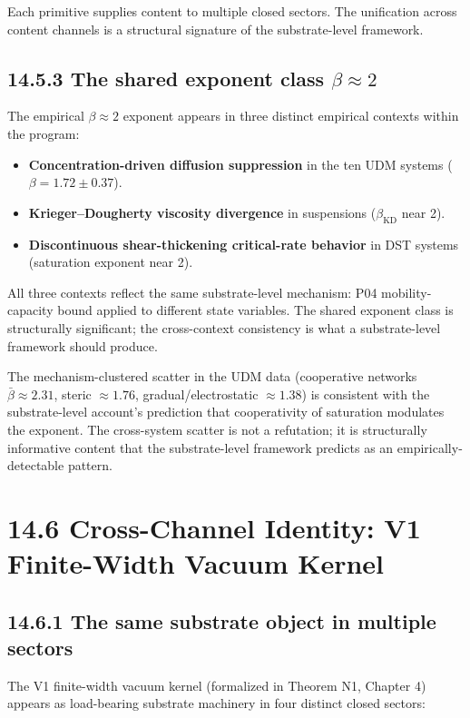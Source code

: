 \documentclass[11pt]{book}
\begin{document}
Each primitive supplies content to multiple closed sectors. The unification across content channels is a structural signature of the substrate-level framework.

\subsection{14.5.3 The shared exponent class $\beta \approx 2$}

The empirical $\beta \approx 2$ exponent appears in three distinct empirical contexts within the program:

\begin{itemize}
\item \textbf{Concentration-driven diffusion suppression} in the ten UDM systems ($\beta = 1.72 \pm 0.37$).
\item \textbf{Krieger–Dougherty viscosity divergence} in suspensions ($\beta_\mathrm{KD}$ near 2).
\item \textbf{Discontinuous shear-thickening critical-rate behavior} in DST systems (saturation exponent near 2).
\end{itemize}

All three contexts reflect the same substrate-level mechanism: P04 mobility-capacity bound applied to different state variables. The shared exponent class is structurally significant; the cross-context consistency is what a substrate-level framework should produce.

The mechanism-clustered scatter in the UDM data (cooperative networks $\bar\beta \approx 2.31$, steric $\approx 1.76$, gradual/electrostatic $\approx 1.38$) is consistent with the substrate-level account's prediction that cooperativity of saturation modulates the exponent. The cross-system scatter is not a refutation; it is structurally informative content that the substrate-level framework predicts as an empirically-detectable pattern.

\section{14.6 Cross-Channel Identity: V1 Finite-Width Vacuum Kernel}

\subsection{14.6.1 The same substrate object in multiple sectors}

The V1 finite-width vacuum kernel (formalized in Theorem N1, Chapter 4) appears as load-bearing substrate machinery in four distinct closed sectors:
\end{document}
